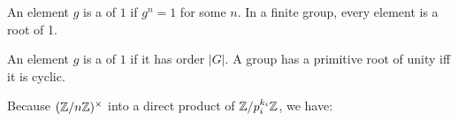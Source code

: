 \begin{definition}
  An element $g$ is a  of $1$ if $g^n = 1$ for some $n$. In
  a finite group, every element is a root of 1.

  An element $g$ is a  of $1$ if it has order
  $|G|$. A group has a primitive root of unity iff it is cyclic.
\end{definition}

\begin{proposition}
  Because $\mathopen{}\left( {\mathbb{Z} / n\mathbb{Z}} \right)\mathclose{}^\times$ into a direct product of $\mathbb{Z} / p_i^{k_i}\mathbb{Z}$, we
  have:

  \begin{nedqn}
  \eqcol
    \lcm{}
  \end{nedqn}
\end{proposition}

